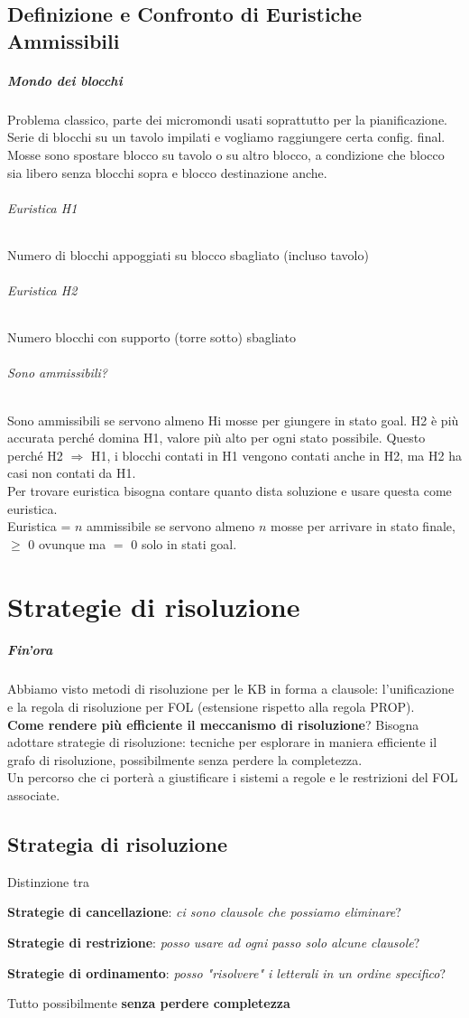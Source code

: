 \documentclass[10pt]{book}
\begin{document}
\section{Definizione e Confronto di Euristiche Ammissibili}
\paragraph{Mondo dei blocchi} Problema classico, parte dei micromondi usati soprattutto per la pianificazione. Serie di blocchi su un tavolo impilati e vogliamo raggiungere certa config. final. Mosse sono spostare blocco su tavolo o su altro blocco, a condizione che blocco sia libero senza blocchi sopra e blocco destinazione anche.
\subparagraph{Euristica H1} Numero di blocchi appoggiati su blocco sbagliato (incluso tavolo)
\subparagraph{Euristica H2} Numero blocchi con supporto (torre sotto) sbagliato
\subparagraph{Sono ammissibili?} Sono ammissibili se servono almeno Hi mosse per giungere in stato goal. H2 è più accurata perché domina H1, valore più alto per ogni stato possibile. Questo perché H2 $\Rightarrow$ H1, i blocchi contati in H1 vengono contati anche in H2, ma H2 ha casi non contati da H1.\\
Per trovare euristica bisogna contare quanto dista soluzione e usare questa come euristica.\\
Euristica = $n$ ammissibile se servono almeno $n$ mosse per arrivare in stato finale, $\geq$ 0 ovunque ma $=$ 0 solo in stati goal.

\chapter{Strategie di risoluzione}
\paragraph{Fin'ora} Abbiamo visto metodi di risoluzione per le KB in forma a clausole: l'unificazione e la regola di risoluzione per FOL (estensione rispetto alla regola PROP).\\
\textbf{Come rendere più efficiente il meccanismo di risoluzione}? Bisogna adottare strategie di risoluzione: tecniche per esplorare in maniera efficiente il grafo di risoluzione, possibilmente senza perdere la completezza.\\
Un percorso che ci porterà a giustificare i sistemi a regole e le restrizioni del FOL associate.
\section{Strategia di risoluzione}
Distinzione tra 
	\begin{list}{}{}
		\item \textbf{Strategie di cancellazione}: \textit{ci sono clausole che possiamo eliminare}?
		\item \textbf{Strategie di restrizione}: \textit{posso usare ad ogni passo solo alcune clausole}?
		\item \textbf{Strategie di ordinamento}: \textit{posso "risolvere" i letterali in un ordine specifico}?
	\end{list}
Tutto possibilmente \textbf{senza perdere completezza}
\end{document}
